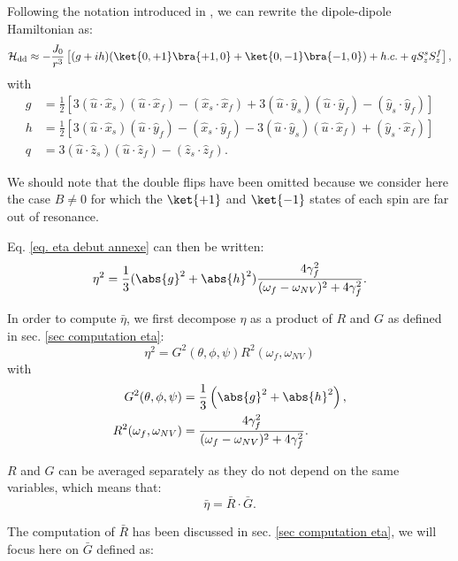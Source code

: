 \documentclass[a4paper, 11pt]{report}
\begin{document}
Following the notation introduced in \citep{choi2017depolarization}, we can rewrite the dipole-dipole Hamiltonian as:
\begin{equation}
\mathcal{H}_{\rm dd} \approx -\frac{J_0}{r^3}\left[(g+ih)(\ket{0,+1}\bra{+1,0}+\ket{0,-1}\bra{-1,0}) + h.c. + q S_z^sS_z^f \right],
\end{equation}
with 
\begin{align}
g&=\frac{1}{2}\left[3(\hat{u}\cdot\hat{x}_s)(\hat{u}\cdot\hat{x}_f) - (\hat{x}_s \cdot \hat{x}_f) + 3(\hat{u}\cdot\hat{y}_s)(\hat{u}\cdot\hat{y}_f) - (\hat{y}_s \cdot \hat{y}_f) \right] \\
h&=\frac{1}{2}\left[3(\hat{u}\cdot\hat{x}_s)(\hat{u}\cdot\hat{y}_f) - (\hat{x}_s \cdot \hat{y}_f) - 3(\hat{u}\cdot\hat{y}_s)(\hat{u}\cdot\hat{x}_f) + (\hat{y}_s \cdot \hat{x}_f) \right] \\
q&= 3(\hat{u}\cdot \hat{z}_s)(\hat{u}\cdot \hat{z}_f) - (\hat{z}_s \cdot \hat{z}_f).
\end{align}

We should note that the double flips have been omitted because we consider here the case $B\neq0$ for which the $\ket{+1}$ and $\ket{-1}$ states of each spin are far out of resonance.

Eq. \ref{eq. eta debut annexe} can then be written:
\begin{equation}
\eta^2=\frac{1}{3} (\abs{g}^2 + \abs{h}^2) \frac{4\gamma_f^2}{(\omega_f - \omega_{NV})^2+4\gamma_f^2}.
\end{equation}

In order to compute $\bar \eta$, we first decompose $\eta$ as a product of $R$ and $G$ as defined in sec. \ref{sec computation eta}:
\begin{equation}
\eta^2=G^2(\theta, \phi, \psi) R^2(\omega_f,\omega_{NV})
\end{equation}
with
\begin{align*}
G^2(\theta, \phi, \psi)&=\frac{1}{3}\left(\abs{g}^2+\abs{h}^2 \right),  \\ 
R^2(\omega_f,\omega_{NV}) &= \frac{4\gamma_f^2}{(\omega_f - \omega_{NV})^2+4\gamma_f^2}.
\end{align*}

$R$ and $G$ can be averaged separately as they do not depend on the same variables, which means that:
\begin{equation}
\label{eq. eta bar r bar g bar}
\bar \eta = \bar R \cdot \bar G.
\end{equation} 

The computation of $\bar{R}$ has been discussed in sec. \ref{sec computation eta}, we will focus here on $\bar{G}$ defined as:
\end{document}
